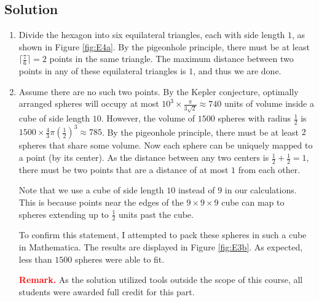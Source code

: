 \documentclass{article}
\begin{document}
\subsection*{Solution}
    \begin{enumerate}
        \item Divide the hexagon into six equilateral triangles, each with side length $1$, as shown in Figure \ref{fig:E4a}. By the pigeonhole principle, there must be at least $\lceil \frac{7}{6} \rceil = 2$ points in the same triangle. The maximum distance between two points in any of these equilateral triangles is $1$, and thus we are done.
        \item \qquad Assume there are no such two points. By the Kepler conjecture, optimally arranged spheres will occupy at most $10^{3} \times \frac{\pi}{3\sqrt{2}} \approx 740$ units of volume inside a cube of side length $10$. However, the volume of $1500$ spheres with radius $\frac{1}{2}$ is $1500 \times \frac{4}{3}\pi(\frac{1}{2})^{3} \approx 785$. By the pigeonhole principle, there must be at least $2$ spheres that share some volume. Now each sphere can be uniquely mapped to a point (by its center). As the distance between any two centers is $\frac{1}{2} + \frac{1}{2} = 1$, there must be two points that are a distance of at most $1$ from each other. 
        
        \vspace{1.5mm}
        \qquad Note that we use a cube of side length $10$ instead of $9$ in our calculations. This is because points near the edges of the $9 \times 9 \times 9$ cube can map to spheres extending up to $\frac{1}{2}$ units past the cube.
        
        \vspace{1.5mm}
        \qquad To confirm this statement, I attempted to pack these spheres in such a cube in Mathematica. The results are displayed in Figure \ref{fig:E3b}. As expected, less than $1500$ spheres were able to fit. 
        
        \vspace{1.5mm}
        \textcolor{red}{\textbf{Remark.}} As the solution utilized tools outside the scope of this course, all students were awarded full credit for this part.
        
        \begin{figure}[htbp]
            \centering
            \begin{minipage}{.45\textwidth}
                \centering
\end{minipage}
\end{figure}
\end{enumerate}
\end{document}
